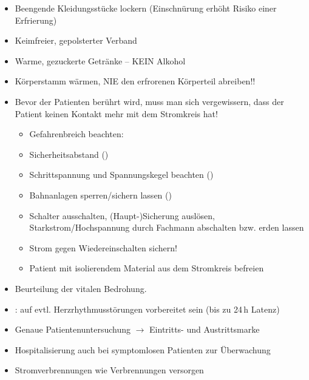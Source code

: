 {%
\begin{itemize}
  \item Beengende Kleidungsstücke lockern (Einschnürung erhöht
  Risiko einer Erfrierung)
  \item Keimfreier, gepolsterter Verband
  \item Warme, gezuckerte Getränke -- KEIN Alkohol
  \item Körperstamm wärmen, NIE den erfrorenen Körperteil abreiben!!
\end{itemize}
}

{
\begin{itemize}
  \item {} Bevor der Patienten berührt wird,
  muss man sich vergewissern, dass der Patient
  keinen Kontakt mehr mit dem Stromkreis hat! 
  \begin{itemize}
    \item Gefahrenbreich beachten:
    \item Sicherheitsabstand
    ()
    \item Schrittspannung und Spannungskegel
    beachten ()
    \item Bahnanlagen sperren/sichern lassen
    ()
    \item Schalter ausschalten, (Haupt-)Sicherung
    auslösen, Starkstrom/Hochspannung durch Fachmann  abschalten bzw.
    erden lassen
    \item Strom gegen Wiedereinschalten sichern!
    \item Patient mit isolierendem Material aus dem Stromkreis befreien

  \end{itemize}
  \item Beurteilung der vitalen Bedrohung.
  \par \TxBeiVit
  \TxMassVitMK
  \item {}: auf evtl.
  Herzrhythmusstörungen vorbereitet sein
  (bis zu 24\,h Latenz)
  \item Genaue Patientenuntersuchung ${\rightarrow}$
  Eintritts- und Austrittsmarke
  \item Hospitalisierung auch bei symptomlosen
  Patienten zur Überwachung
  \item Stromverbrennungen wie Verbrennungen versorgen
\end{itemize}
}




